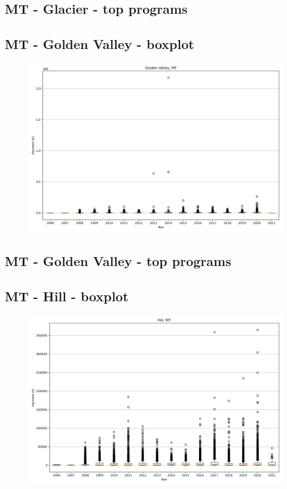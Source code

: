 \subsection*{MT - Glacier - top programs}

\newpage
\subsection*{MT - Golden Valley - boxplot}
\begin{figure}[h]
\centering
\includegraphics[width=7in]{../output/boxplots/counties/Golden Valley-MT_boxplot.png}
\end{figure}


\subsection*{MT - Golden Valley - top programs}

\newpage
\subsection*{MT - Hill - boxplot}
\begin{figure}[h]
\centering
\includegraphics[width=7in]{../output/boxplots/counties/Hill-MT_boxplot.png}
\end{figure}


